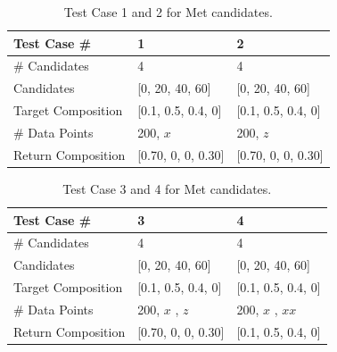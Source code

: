 \begin{table}[ht!]
\begin{center}
\begin{tabular}{| l | l | l |  }
\hline
Test Case \# & 1 & 2 \\
\hline
\# Candidates & 4 & 4 \\
\hline
Candidates & [0, 20, 40, 60] & [0, 20, 40, 60] \\
\hline
Target Composition & [0.1, 0.5, 0.4, 0] & [0.1, 0.5, 0.4, 0] \\
\hline
\# Data Points & 200, $x$ & 200, $z$ \\
\hline
Return Composition & [0.70, 0, 0, 0.30] & [0.70, 0, 0, 0.30] \\
\hline
\end{tabular} 
\end{center}
\caption{Test Case 1 and 2 for Met candidates.} 
\label{tab:4.1}
\end{table}	

\begin{table}[ht!]
\begin{center}
\begin{tabular}{| l | p{3cm}| p{3cm} | }
\hline
Test Case \# & 3 & 4 \\
\hline
\# Candidates & 4 & 4  \\
\hline
Candidates & [0, 20, 40, 60] & [0, 20, 40, 60]\\
\hline
Target Composition & [0.1, 0.5, 0.4, 0] & [0.1, 0.5, 0.4, 0]\\
\hline
\# Data Points & 200, $x$ \newline 200, $z$ & 200, $x$ \newline 200, $xx$\\
\hline
Return Composition & [0.70, 0, 0, 0.30] & [0.1, 0.5, 0.4, 0]\\
\hline
\end{tabular} 
\end{center}
\caption{Test Case 3 and 4 for Met candidates.} 
\label{tab:case3and4}
\end{table}	

